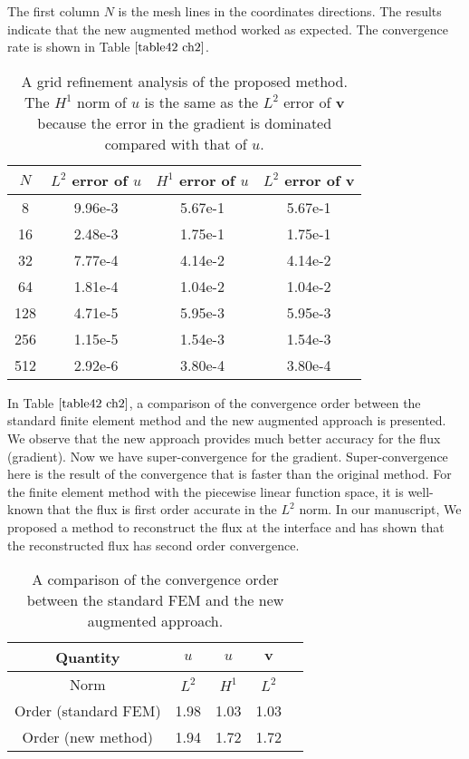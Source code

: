 \documentclass[11pt]{article}
\numberwithin{equation}{section}
\begin{document}
The first column $N$ is the mesh lines in the coordinates directions.
The results indicate that the new augmented method worked as expected.
The convergence rate is shown in Table $\ref{table42 ch2}$.

\begin{table}[H]
\centering
\begin{tabular}{|c|c|c|c|}
\hline
 $N$  & $L^2$ error of ${u}$ & $H^1$ error of ${u}$ & $L^2$ error of $\mathbf{v}$ \\
\hline
8 & 9.96e-3 & 5.67e-1 & 5.67e-1 \\
\hline
16 & 2.48e-3 & 1.75e-1 & 1.75e-1 \\
\hline
32 & 7.77e-4 & 4.14e-2 & 4.14e-2 \\
\hline
64 & 1.81e-4 & 1.04e-2 & 1.04e-2 \\
\hline
128 & 4.71e-5 & 5.95e-3 & 5.95e-3 \\
\hline
256 & 1.15e-5 &1.54e-3 & 1.54e-3 \\
\hline
512 & 2.92e-6 &3.80e-4 & 3.80e-4 \\
\hline
\end{tabular}
\caption{A grid refinement analysis of the proposed method.  The $H^1$ norm of $u$ is the same as the $L^2$ error of $\mathbf{v}$ because the error in the gradient is dominated compared with that of $u$.} \label{table41 ch2}
\end{table}

In Table $\ref{table42 ch2}$,
a comparison of the convergence order between the standard finite element method and the new augmented approach is presented.
We observe that the new approach provides much better accuracy for the flux (gradient).
Now we have super-convergence for the gradient.
Super-convergence here is the result of the convergence that is faster than the original method.
For the finite element method with the piecewise linear function space,
it is well-known that the flux is first order accurate in the $L^2$ norm.
In our manuscript, We proposed a method to reconstruct the flux at the interface
and has shown that the reconstructed flux  has second order convergence.
\begin{table}[H]
\centering
\begin{tabular}{|c|c|c|c|c|}
\hline
Quantity &$u$  & $u$ &$\mathbf{v}$ \\
\hline
 Norm & $L^2$ & $H^1$ &$L^2$ \\
\hline
Order (standard FEM) & 1.98 & 1.03 & 1.03\\
\hline
Order (new  method)  & 1.94 & 1.72 & 1.72\\
\hline
\end{tabular}
\caption{A comparison of the convergence order between the standard FEM and the new augmented approach.\label{table42 ch2}}
\end{table}
\end{document}

